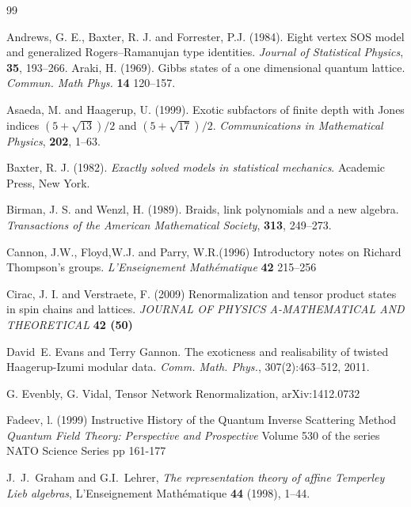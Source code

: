 \documentclass[11pt]{amsart}
\newcommand{\1}{\mathcal I}
\newcommand{\5}{\vskip 5pt}
\begin{document}
\begin{thebibliography}{99}

Andrews, G. E., Baxter, R. J. and Forrester, P.J. (1984).
Eight vertex SOS model and generalized
Rogers--Ramanujan type identities.
{\em Journal of Statistical Physics},  {\bf 35}, 
193--266.
Araki, H. (1969).
Gibbs states of a one dimensional quantum lattice.
{\em Commun. Math Phys. } {\bf 14 } 120--157.


Asaeda, M. and Haagerup, U. (1999).
Exotic subfactors of finite depth with Jones indices
${(5+\sqrt{13})}/{2}$ and ${(5+\sqrt{17})}/{2}$.
{\em Communications in Mathematical Physics},
{\bf 202}, 1--63.


Baxter, R. J. (1982).
{\em Exactly solved models in statistical mechanics}.
Academic Press, New York.


Birman, J. S. and Wenzl, H. (1989).
Braids, link polynomials and a new algebra.
{\em Transactions of the American Mathematical Society}, 
{\bf 313}, 249--273.

Cannon, J.W., Floyd,W.J. and Parry, W.R.(1996)
Introductory notes on Richard Thompson's groups.
{\em L'Enseignement  Math\'ematique} 
{\bf 42} 215--256

Cirac, J. I. and Verstraete, F. (2009)
Renormalization and tensor product states in spin chains and lattices.
 {\em JOURNAL OF PHYSICS A-MATHEMATICAL AND THEORETICAL}
 {\bf 42 (50)}







David~E. Evans and Terry Gannon.
 The exoticness and realisability of twisted {H}aagerup-{I}zumi
  modular data.
{\em Comm. Math. Phys.}, 307(2):463--512, 2011.


G. Evenbly, G. Vidal,
Tensor Network Renormalization,
arXiv:1412.0732

Fadeev, l. (1999)
Instructive History of the Quantum Inverse Scattering Method
{\em Quantum Field Theory: Perspective and Prospective}
Volume 530 of the series NATO Science Series pp 161-177






J.~J.~Graham and G.I.~Lehrer, \emph{The representation theory of affine Temperley 
Lieb algebras}, L'Enseignement Math\'ematique \textbf{44} (1998), 1--44. 




\end{thebibliography}
\end{document}
